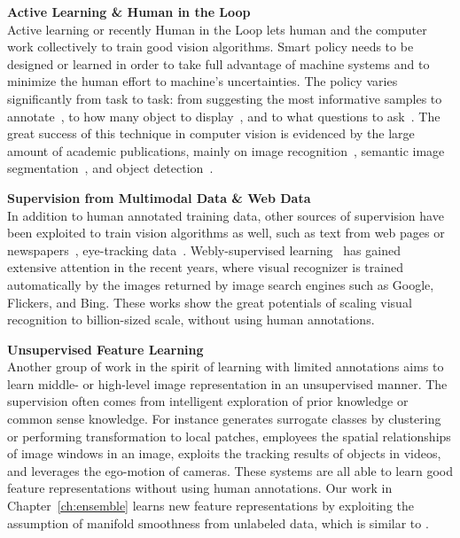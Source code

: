  
\textbf{  {Active Learning \& Human in the Loop}}  \\
Active learning or recently Human in the Loop lets human and the computer work collectively to train good vision algorithms.  Smart policy needs to be designed or learned in order to take full advantage of machine systems and to minimize the human effort  to machine's uncertainties.  The policy varies significantly from task to task: from suggesting the most informative samples to annotate~\citep{AFrameSel, SIEAL}, to how many object to display~\citep{yao2012interactive}, and to what questions to ask~\citep{best:two:world, donot:bbox}. The great success of this technique in computer vision is evidenced by the large amount of academic publications, mainly on image recognition~\citep{joshi2009multi, visual:human:loop, ALdataset}, semantic image segmentation~\citep{expected:loss},  and object detection~\citep{best:two:world, donot:bbox}. 

\textbf{  {Supervision from Multimodal Data \& Web Data }}   \\
In addition to human annotated training data, other sources of supervision have been exploited to train vision algorithms as well, such as text from web pages or newspapers~\citep{name:face:news, gupta2008beyond}, eye-tracking data~\citep{detect:eyetr}.
Webly-supervised learning~\citep{neil, webly:cnn, everything:anything} has gained extensive attention in the recent years, where visual recognizer is trained automatically by the images returned by image search engines such as Google, Flickers, and Bing. These works show the great potentials of scaling visual recognition to billion-sized scale, without using human annotations. 



\textbf{ {Unsupervised Feature Learning  }}   \\
Another group of work in the spirit of learning with limited annotations aims to learn middle- or high-level image
representation in an unsupervised manner. The supervision often comes from intelligent exploration of prior knowledge or common sense knowledge.  For instance \citep{stl-10, cnnfet14}  generates surrogate classes by clustering or performing transformation to local patches, \citep{feature:context} employees the spatial relationships of 
image windows in an image, \citep{feature:video} exploits 
the tracking results of objects in videos, and \citep{learning:by:moving}  leverages the ego-motion of cameras.    
These systems are all able to learn good feature representations without using human annotations.  
Our work in Chapter~\ref{ch:ensemble} learns new feature representations by exploiting the assumption of manifold smoothness from unlabeled data, which is similar to \citep{stl-10, cnnfet14}. 
 

